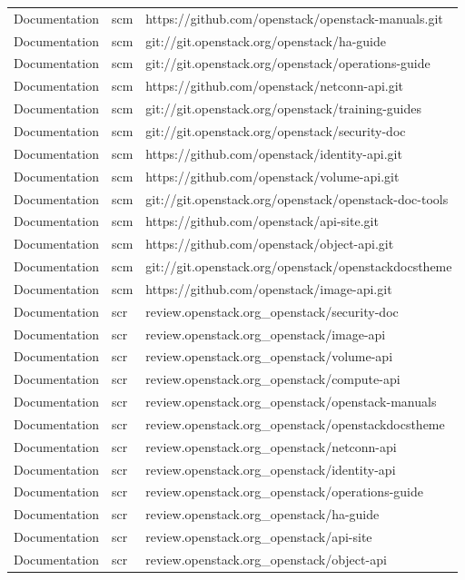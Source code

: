 \begin{center}
\begin{longtable}{|p{4cm}|p{1cm}|p{10cm}|}
Documentation&scm&https://github.com/openstack/openstack-manuals.git\\
Documentation&scm&git://git.openstack.org/openstack/ha-guide\\
Documentation&scm&git://git.openstack.org/openstack/operations-guide\\
Documentation&scm&https://github.com/openstack/netconn-api.git\\
Documentation&scm&git://git.openstack.org/openstack/training-guides\\
Documentation&scm&git://git.openstack.org/openstack/security-doc\\
Documentation&scm&https://github.com/openstack/identity-api.git\\
Documentation&scm&https://github.com/openstack/volume-api.git\\
Documentation&scm&git://git.openstack.org/openstack/openstack-doc-tools\\
Documentation&scm&https://github.com/openstack/api-site.git\\
Documentation&scm&https://github.com/openstack/object-api.git\\
Documentation&scm&git://git.openstack.org/openstack/openstackdocstheme\\
Documentation&scm&https://github.com/openstack/image-api.git\\
Documentation&scr&review.openstack.org\_openstack/security-doc\\
Documentation&scr&review.openstack.org\_openstack/image-api\\
Documentation&scr&review.openstack.org\_openstack/volume-api\\
Documentation&scr&review.openstack.org\_openstack/compute-api\\
Documentation&scr&review.openstack.org\_openstack/openstack-manuals\\
Documentation&scr&review.openstack.org\_openstack/openstackdocstheme\\
Documentation&scr&review.openstack.org\_openstack/netconn-api\\
Documentation&scr&review.openstack.org\_openstack/identity-api\\
Documentation&scr&review.openstack.org\_openstack/operations-guide\\
Documentation&scr&review.openstack.org\_openstack/ha-guide\\
Documentation&scr&review.openstack.org\_openstack/api-site\\
Documentation&scr&review.openstack.org\_openstack/object-api\\

\end{longtable}
\end{center}

